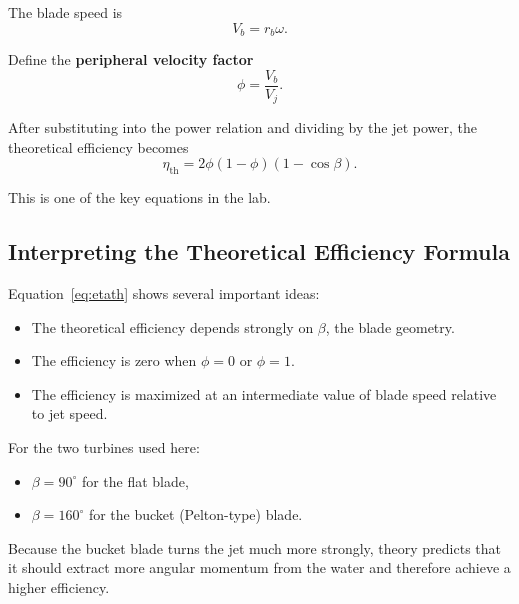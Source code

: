 \documentclass[12pt,letterpaper]{article}
\begin{document}
The blade speed is
\begin{equation}
V_b = r_b\omega.
\label{eq:vb}
\end{equation}

Define the \textbf{peripheral velocity factor}
\begin{equation}
\phi = \frac{V_b}{V_j}.
\label{eq:phi}
\end{equation}

After substituting into the power relation and dividing by the jet power, the theoretical efficiency becomes
\begin{equation}
\eta_{\text{th}} = 2\phi(1-\phi)(1-\cos\beta).
\label{eq:etath}
\end{equation}

This is one of the key equations in the lab.

\subsection{Interpreting the Theoretical Efficiency Formula}
Equation~\eqref{eq:etath} shows several important ideas:
\begin{itemize}[leftmargin=*]
    \item The theoretical efficiency depends strongly on \(\beta\), the blade geometry.
    \item The efficiency is zero when \(\phi=0\) or \(\phi=1\).
    \item The efficiency is maximized at an intermediate value of blade speed relative to jet speed.
\end{itemize}

For the two turbines used here:
\begin{itemize}[leftmargin=*]
    \item \(\beta = 90^\circ\) for the flat blade,
    \item \(\beta = 160^\circ\) for the bucket (Pelton-type) blade.
\end{itemize}

Because the bucket blade turns the jet much more strongly, theory predicts that it should extract more angular momentum from the water and therefore achieve a higher efficiency.
\end{document}
